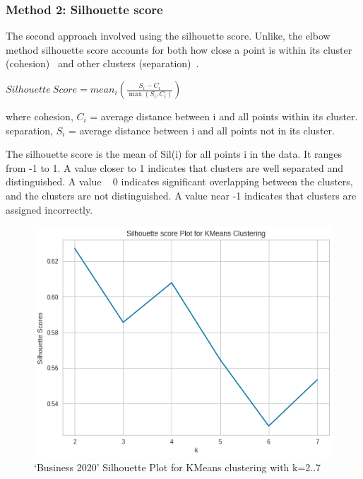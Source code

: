 \subsubsection{Method 2: Silhouette score}

The second approach involved using the silhouette score. Unlike, the elbow method silhouette score accounts for both how close a point is within its cluster (cohesion)~\cite{elbowvssil} and other clusters (separation)~\cite{silhouette}.

\begin{center}
    $\mathit{Silhouette \ Score }= \mathit{mean}_i (\frac{S_i - C_i}{\max(S_i, C_i)}) $
\end{center}
where 
cohesion, $C_i$ = average distance between i and all points within its cluster.
separation, $S_i$ = average distance between i and all points not in its cluster.

The silhouette score is the mean of Sil(i) for all points i in the data. It ranges from -1 to 1. A value closer to 1 indicates that clusters are well separated and distinguished. A value ~ 0 indicates significant overlapping between the clusters, and the clusters are not distinguished. A value near -1 indicates that clusters are assigned incorrectly.

\begin{figure}[H]
\centering
\includegraphics[width=0.4\linewidth]{images/sil_kmeans_.png}
\caption{`Business 2020' Silhouette Plot for KMeans clustering with k=2..7}
\label{fig:sil_kmeans}
\end{figure}
\vspace{-2ex}

